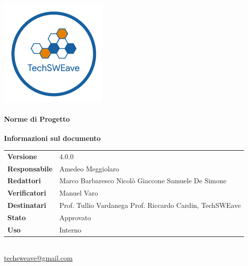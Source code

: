\documentclass[a4paper]{article}
\begin{document}
\begin{titlepage}
    \begin{center}
        \includegraphics{../../../Images/logo}\\
        \vspace{20px}
        \textcolor{logo}{\hrulefill}\\
        \vspace{20px}
        \textbf{\huge\textcolor{logo}{Norme di Progetto}}\\
        \vspace{10px}
        \textcolor{logo}{\hrulefill}\\
        \vspace{40px}
        \textbf{\Large Informazioni sul documento}\\
        \vspace{20px}
        \begin{tabular}{p{100px} | p{100px}}
            \textbf{Versione}     & 4.0.0                                                                      \\
            \textbf{Responsabile} & Amedeo Meggiolaro                                                          \\
            \textbf{Redattori}    & Marco Barbaresco \newline Nicolò Giaccone \newline Samuele De Simone       \\
            \textbf{Verificatori} & Manuel Varo                                                                \\
            \textbf{Destinatari}  & Prof. Tullio Vardanega \newline Prof. Riccardo Cardin, \newline TechSWEave \\
            \textbf{Stato}        & Approvato                                                                  \\
            \textbf{Uso}          & Interno                                                                    \\
        \end{tabular}\\
        \vspace{60px}
        \href{mailto:techsweave@gmail.com}{techsweave@gmail.com}\\
    \end{center}
\end{titlepage}
\end{document}
